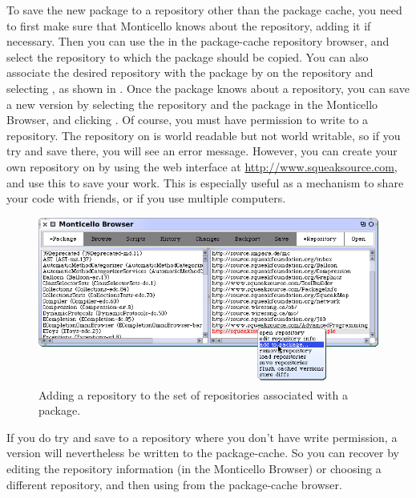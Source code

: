 \documentclass[a4paper,10pt,twoside]{book}
\begin{document}
To save the new package to a repository other than the package cache, you need to first make sure that Monticello knows about the repository, adding it if necessary.  
Then you can use the  in the package-cache repository browser, and select the repository to which the package should be copied.  
You can also associate the desired repository with the package by  on the repository and selecting , as shown in .  
Once the package knows about a repository, you can save a new version by selecting the repository and the package in the Monticello Browser, and clicking .  
Of course, you must have permission to write to a repository.  
The  repository on \emphind{\sqsrc} is world readable but not world writable, so if you try and save there, you will see an error message.  
However, you can create your own repository on \sqsrc by using the web interface at \url{http://www.squeaksource.com}, and use this to save your work. 
This is especially useful as a mechanism to share your code with friends, or if you use multiple computers.

\begin{figure}[tbp]
	\begin{center}
		\includegraphics[width=\textwidth]{MCaddToPackage}
	\end{center}
	\caption{Adding a repository to the set of repositories associated with a package.}
\end{figure}

If you do try and save to a repository where you don't have write permission, a version will nevertheless be written to the package-cache.  
So you can recover by editing the repository information (\actclick in the Monticello Browser) or choosing a different repository, and then using  from the package-cache browser.
\end{document}
